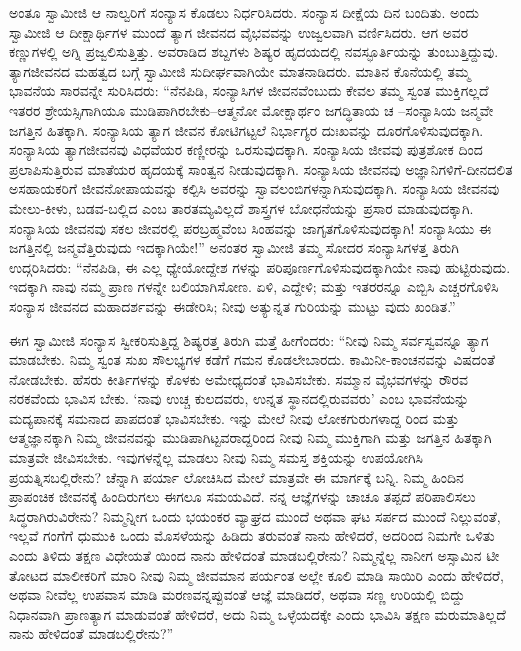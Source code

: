 ಅಂತೂ ಸ್ವಾಮೀಜಿ ಆ ನಾಲ್ವರಿಗೆ ಸಂನ್ಯಾಸ ಕೊಡಲು ನಿರ್ಧರಿಸಿದರು. ಸಂನ್ಯಾಸ ದೀಕ್ಷೆಯ ದಿನ ಬಂದಿತು. ಅಂದು ಸ್ವಾಮೀಜಿ ಆ ದೀಕ್ಷಾರ್ಥಿಗಳ ಮುಂದೆ ತ್ಯಾಗ ಜೀವನದ ವೈಭವವನ್ನು ಉಜ್ವಲವಾಗಿ ವರ್ಣಿಸಿದರು. ಆಗ ಅವರ ಕಣ್ಣುಗಳಲ್ಲಿ ಅಗ್ನಿ ಪ್ರಜ್ವಲಿಸುತ್ತಿತ್ತು. ಅವರಾಡಿದ ಶಬ್ದಗಳು ಶಿಷ್ಯರ ಹೃದಯದಲ್ಲಿ ನವಸ್ಫೂರ್ತಿಯನ್ನು ತುಂಬುತ್ತಿದ್ದುವು. ತ್ಯಾಗಜೀವನದ ಮಹತ್ವದ ಬಗ್ಗೆ ಸ್ವಾಮೀಜಿ ಸುದೀರ್ಘವಾಗಿಯೇ ಮಾತನಾಡಿದರು. ಮಾತಿನ ಕೊನೆಯಲ್ಲಿ ತಮ್ಮ ಭಾವನೆಯ ಸಾರವನ್ನೇ ಸುರಿಸಿದರು: “ನೆನಪಿಡಿ, ಸಂನ್ಯಾಸಿಗಳ ಜೀವನವೆಂಬುದು ಕೇವಲ ತಮ್ಮ ಸ್ವಂತ ಮುಕ್ತಿಗಲ್ಲದೆ ಇತರರ ಶ್ರೇಯಸ್ಸಿಗಾಗಿಯೂ ಮುಡಿಪಾಗಿರಬೇಕು–ಆತ್ಮನೋ ಮೋಕ್ಷಾರ್ಥಂ ಜಗದ್ಧಿತಾಯ ಚ –ಸಂನ್ಯಾಸಿಯ ಜನ್ಮವೇ ಜಗತ್ತಿನ ಹಿತಕ್ಕಾಗಿ. ಸಂನ್ಯಾಸಿಯ ತ್ಯಾಗ ಜೀವನ ಕೋಟಿಗಟ್ಟಲೆ ನಿರ್ಭಾಗ್ಯರ ದುಃಖವನ್ನು ದೂರಗೊಳಿಸುವುದಕ್ಕಾಗಿ. ಸಂನ್ಯಾಸಿಯ ತ್ಯಾಗಜೀವನವು ವಿಧವೆಯರ ಕಣ್ಣೀರನ್ನು ಒರಸುವುದಕ್ಕಾಗಿ. ಸಂನ್ಯಾಸಿಯ ಜೀವವು ಪುತ್ರಶೋಕ ದಿಂದ ಪ್ರಲಾಪಿಸುತ್ತಿರುವ ಮಾತೆಯರ ಹೃದಯಕ್ಕೆ ಸಾಂತ್ವನ ನೀಡುವುದಕ್ಕಾಗಿ. ಸಂನ್ಯಾಸಿಯ ಜೀವನವು ಅಜ್ಞಾನಿಗಳಿಗೆ-ದೀನದಲಿತ ಅಸಹಾಯಕರಿಗೆ ಜೀವನೋಪಾಯವನ್ನು ಕಲ್ಪಿಸಿ ಅವರನ್ನು ಸ್ವಾವಲಂಬಿಗಳನ್ನಾಗಿಸುವುದಕ್ಕಾಗಿ. ಸಂನ್ಯಾಸಿಯ ಜೀವನವು ಮೇಲು-ಕೀಳು, ಬಡವ-ಬಲ್ಲಿದ ಎಂಬ ತಾರತಮ್ಯವಿಲ್ಲದೆ ಶಾಸ್ತ್ರಗಳ ಬೋಧನೆಯನ್ನು ಪ್ರಸಾರ ಮಾಡುವುದಕ್ಕಾಗಿ. ಸಂನ್ಯಾಸಿಯ ಜೀವನವು ಸಕಲ ಜೀವರಲ್ಲಿ ಪರಬ್ರಹ್ಮವೆಂಬ ಸಿಂಹವನ್ನು ಜಾಗೃತಗೊಳಿಸುವುದಕ್ಕಾಗಿ! ಸಂನ್ಯಾಸಿಯು ಈ ಜಗತ್ತಿನಲ್ಲಿ ಜನ್ಮವೆತ್ತಿರುವುದು ಇದಕ್ಕಾಗಿಯೇ!” ಅನಂತರ ಸ್ವಾಮೀಜಿ ತಮ್ಮ ಸೋದರ ಸಂನ್ಯಾಸಿಗಳತ್ತ ತಿರುಗಿ ಉದ್ಗರಿಸಿದರು: “ನೆನಪಿಡಿ, ಈ ಎಲ್ಲ ಧ್ಯೇಯೋದ್ದೇಶ ಗಳನ್ನು ಪರಿಪೂರ್ಣಗೊಳಿಸುವುದಕ್ಕಾಗಿಯೇ ನಾವು ಹುಟ್ಟಿರುವುದು. ಇದಕ್ಕಾಗಿ ನಾವು ನಮ್ಮ ಪ್ರಾಣ ಗಳನ್ನೇ ಬಲಿಯಾಗಿಸೋಣ. ಏಳಿ, ಎದ್ದೇಳಿ; ಮತ್ತು ಇತರರನ್ನೂ ಎಬ್ಬಿಸಿ ಎಚ್ಚರಗೊಳಿಸಿ ಸಂನ್ಯಾಸ ಜೀವನದ ಮಹಾದರ್ಶವನ್ನು ಈಡೇರಿಸಿ; ನೀವು ಅತ್ಯುನ್ನತ ಗುರಿಯನ್ನು ಮುಟ್ಟು ವುದು ಖಂಡಿತ.”

ಈಗ ಸ್ವಾಮೀಜಿ ಸಂನ್ಯಾಸ ಸ್ವೀಕರಿಸುತ್ತಿದ್ದ ಶಿಷ್ಯರತ್ತ ತಿರುಗಿ ಮತ್ತೆ ಹೀಗೆಂದರು: “ನೀವು ನಿಮ್ಮ ಸರ್ವಸ್ವವನ್ನೂ ತ್ಯಾಗ ಮಾಡಬೇಕು. ನಿಮ್ಮ ಸ್ವಂತ ಸುಖ ಸೌಲಭ್ಯಗಳ ಕಡೆಗೆ ಗಮನ ಕೊಡಲೇಬಾರದು. ಕಾಮಿನೀ-ಕಾಂಚನವನ್ನು ವಿಷದಂತೆ ನೋಡಬೇಕು. ಹೆಸರು ಕೀರ್ತಿಗಳನ್ನು ಕೊಳಕು ಅಮೇಧ್ಯದಂತೆ ಭಾವಿಸಬೇಕು. ಸಮ್ಮಾನ ವೈಭವಗಳನ್ನು ರೌರವ ನರಕವೆಂದು ಭಾವಿಸ ಬೇಕು. ‘ನಾವು ಉಚ್ಚ ಕುಲದವರು, ಉನ್ನತ ಸ್ಥಾನದಲ್ಲಿರುವವರು’ ಎಂಬ ಭಾವನೆಯನ್ನು ಮದ್ಯಪಾನಕ್ಕೆ ಸಮನಾದ ಪಾಪದಂತೆ ಭಾವಿಸಬೇಕು. ಇನ್ನು ಮೇಲೆ ನೀವು ಲೋಕಗುರುಗಳಾದ್ದ ರಿಂದ ಮತ್ತು ಆತ್ಮಜ್ಞಾನಕ್ಕಾಗಿ ನಿಮ್ಮ ಜೀವನವನ್ನು ಮುಡಿಪಾಗಿಟ್ಟವರಾದ್ದರಿಂದ ನೀವು ನಿಮ್ಮ ಮುಕ್ತಿಗಾಗಿ ಮತ್ತು ಜಗತ್ತಿನ ಹಿತಕ್ಕಾಗಿ ಮಾತ್ರವೇ ಜೀವಿಸಬೇಕು. ಇವುಗಳನ್ನೆಲ್ಲ ಮಾಡಲು ನೀವು ನಿಮ್ಮ ಸಮಸ್ತ ಶಕ್ತಿಯನ್ನು ಉಪಯೋಗಿಸಿ ಪ್ರಯತ್ನಿಸಬಲ್ಲಿರೇನು? ಚೆನ್ನಾಗಿ ಪರ್ಯಾ ಲೋಚಿಸಿದ ಮೇಲೆ ಮಾತ್ರವೇ ಈ ಮಾರ್ಗಕ್ಕೆ ಬನ್ನಿ. ನಿಮ್ಮ ಹಿಂದಿನ ಪ್ರಾಪಂಚಿಕ ಜೀವನಕ್ಕೆ ಹಿಂದಿರುಗಲು ಈಗಲೂ ಸಮಯವಿದೆ. ನನ್ನ ಆಜ್ಞೆಗಳನ್ನು ಚಾಚೂ ತಪ್ಪದೆ ಪರಿಪಾಲಿಸಲು ಸಿದ್ಧರಾಗಿರುವಿರೇನು? ನಿಮ್ಮನ್ನೀಗ ಒಂದು ಭಯಂಕರ ವ್ಯಾಘ್ರದ ಮುಂದೆ ಅಥವಾ ಘಟ ಸರ್ಪದ ಮುಂದೆ ನಿಲ್ಲುವಂತೆ, ಇಲ್ಲವೆ ಗಂಗೆಗೆ ಧುಮುಕಿ ಒಂದು ಮೊಸಳೆಯನ್ನು ಹಿಡಿದು ತರುವಂತೆ ನಾನು ಹೇಳಿದರೆ, ಅದರಿಂದ ನಿಮಗೇ ಒಳಿತು ಎಂದು ತಿಳಿದು ತಕ್ಷಣ ವಿಧೇಯತೆ ಯಿಂದ ನಾನು ಹೇಳಿದಂತೆ ಮಾಡಬಲ್ಲಿರೇನು? ನಿಮ್ಮನ್ನೆಲ್ಲ ನಾನೀಗ ಅಸ್ಸಾಮಿನ ಟೀ ತೋಟದ ಮಾಲೀಕರಿಗೆ ಮಾರಿ ನೀವು ನಿಮ್ಮ ಜೀವಮಾನ ಪರ್ಯಂತ ಅಲ್ಲೇ ಕೂಲಿ ಮಾಡಿ ಸಾಯಿರಿ ಎಂದು ಹೇಳಿದರೆ, ಅಥವಾ ನೀವೆಲ್ಲ ಉಪವಾಸ ಮಾಡಿ ಮರಣವನ್ನಪ್ಪುವಂತೆ ಆಜ್ಞೆ ಮಾಡಿದರೆ, ಅಥವಾ ಸಣ್ಣ ಉರಿಯಲ್ಲಿ ಬಿದ್ದು ನಿಧಾನವಾಗಿ ಪ್ರಾಣತ್ಯಾಗ ಮಾಡುವಂತೆ ಹೇಳಿದರೆ, ಅದು ನಿಮ್ಮ ಒಳ್ಳೆಯದಕ್ಕೇ ಎಂದು ಭಾವಿಸಿ ತಕ್ಷಣ ಮರುಮಾತಿಲ್ಲದೆ ನಾನು ಹೇಳಿದಂತೆ ಮಾಡಬಲ್ಲಿರೇನು?”

